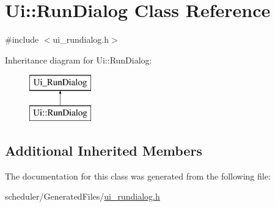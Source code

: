 \hypertarget{class_ui_1_1_run_dialog}{}\section{Ui\+::Run\+Dialog Class Reference}
\label{class_ui_1_1_run_dialog}


{\ttfamily \#include $<$ui\+\_\+rundialog.\+h$>$}

Inheritance diagram for Ui\+::Run\+Dialog\+:\begin{figure}[H]
\begin{center}
\leavevmode
\includegraphics[height=2.000000cm]{d1/d99/class_ui_1_1_run_dialog}
\end{center}
\end{figure}
\subsection*{Additional Inherited Members}


The documentation for this class was generated from the following file\+:\begin{DoxyCompactItemize}
\item 
scheduler/\+Generated\+Files/\mbox{\hyperlink{ui__rundialog_8h}{ui\+\_\+rundialog.\+h}}\end{DoxyCompactItemize}
